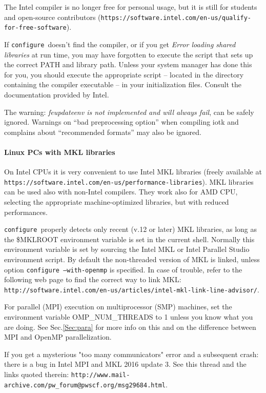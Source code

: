 \documentclass[12pt,a4paper]{article}
\def\configure{\texttt{configure}}
\begin{document}
The Intel compiler is no longer free for personal usage, but it is still
for students and open-source contributors
(\texttt{https://software.intel.com/en-us/qualify-for-free-software}).

If \configure\ doesn't find the compiler, or if you get
{\em Error loading shared libraries} at run time, you may have
forgotten to execute the script that
sets up the correct PATH and library path. Unless your system manager has
done this for you, you should execute the appropriate script -- located in
the directory containing the compiler executable -- in your
initialization files. Consult the documentation provided by Intel.

The warning: {\em feupdateenv is not implemented and will always fail},
can be safely ignored. Warnings on ``bad preprocessing option'' when compiling
iotk and complains about ``recommended formats'' may also be ignored.

\paragraph{Linux PCs with MKL libraries}
On Intel CPUs it is very convenient to use Intel MKL libraries
(freely available at
\texttt{https://software.intel.com/en-us/performance-libraries}).
MKL libraries can be used also with non-Intel compilers.
They work also for AMD CPU, selecting the appropriate machine-optimized
libraries, but with reduced performances.

\configure\ properly detects only recent (v.12 or later) MKL libraries,
as long as the \$MKLROOT environment variable is set in the current shell.
Normally this environment variable is set by sourcing the Intel MKL or Intel 
Parallel Studio environment script.
By default the non-threaded version of MKL is linked, unless option
\texttt{configure --with-openmp} is specified. In case of trouble,
refer to the following web page to find the correct way to link MKL:\\
\texttt{http://software.intel.com/en-us/articles/intel-mkl-link-line-advisor/}.

For parallel (MPI) execution on multiprocessor (SMP) machines, set the
environment variable OMP\_NUM\_THREADS to 1 unless you know what you
are doing. See Sec.\ref{Sec:para} for more info on this
and on the difference between MPI and OpenMP parallelization.

If you get a mysterious "too many communicators" error and a 
subsequent crash: there is a bug in Intel MPI and MKL 2016 update 3.
See this thread and the links quoted therein:
\verb|http://www.mail-archive.com/pw_forum@pwscf.org/msg29684.html|.
\end{document}
